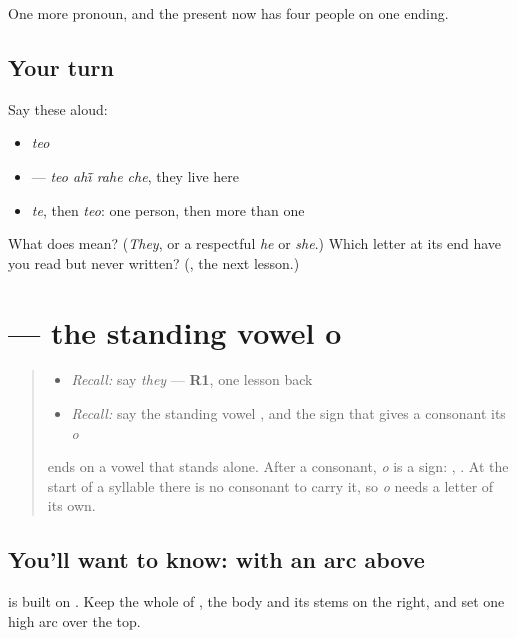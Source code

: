 \begin{grammarlens}[title={What you've built}]
One more pronoun, and the present now has four people on one ending.
\end{grammarlens}

\subsection*{Your turn}
Say these aloud:

\begin{itemize}
\raggedright
  \item \emph{teo}
  \item \textbf{   } — \emph{teo ahī̃ rahe che}, they live here
  \item \emph{te}, then \emph{teo}: one person, then more than one
\end{itemize}

\begin{tcolorbox}[breakable,colback=teal!4,colframe=teal!35!black,title={Before you move on}]
What does \textbf{} mean? (\emph{They}, or a respectful \emph{he} or \emph{she}.) Which letter at its end have you read but never written? (\textbf{}, the next lesson.)
\end{tcolorbox}
\section[\texorpdfstring{\gu{ઓ} (o)}{ઓ (o)}]{ — the standing vowel o}

\label{lesson:GU-W46-o}



\begin{quote}
\begin{itemize}
\raggedright
  \item \emph{Recall:} say \emph{they} — \textbf{R1}, one lesson back
  \item \emph{Recall:} say the standing vowel \textbf{}, and the sign \textbf{} that gives a consonant its \emph{o}
\end{itemize}

\textbf{} ends on a vowel that stands alone. After a consonant, \emph{o} is a sign: \textbf{}, \textbf{}. At the start of a syllable there is no consonant to carry it, so \emph{o} needs a letter of its own.
\end{quote}

\subsection*{You'll want to know:  with an arc above}
\textbf{} is built on \textbf{}. Keep the whole of \textbf{}, the body and its stems on the right, and set one high arc over the top.

